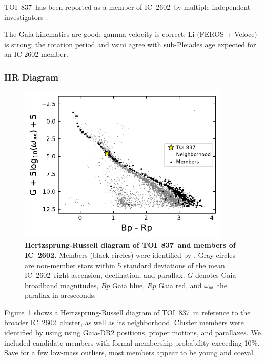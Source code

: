 \documentclass[12pt,twocolumn,tighten]{aastex62}
\newcommand{\tn}{TOI~837} %
\newcommand{\cn}{IC~2602} %
\begin{document}
\tn\ has been reported as a member of \cn\ by multiple independent 
investigators \citep{Kharchenko_et_al_2013,cantatgaudin_gaia_2018}.

The Gaia kinematics are good; gamma velocity is correct; Li (FEROS +
Veloce) is strong; the rotation period and vsini agree with
sub-Pleiades age expected for an IC 2602 member.

\subsubsection{HR Diagram}
\begin{figure}[t!]
	\begin{center}
		\leavevmode
		\includegraphics[width=0.9\textwidth]{f7.pdf}
	\end{center}
	\vspace{-0.7cm}
	\caption{ 
  {\bf Hertzsprung-Russell diagram of \tn\ and members of \cn.}
  Members (black circles) were identified by
  \citet{cantatgaudin_gaia_2018}.  Gray circles are non-member stars
  within 5 standard deviations of the mean \cn\ right ascension,
  declination, and parallax.  $G$ denotes Gaia broadband magnitudes,
  $Bp$ Gaia blue, $Rp$ Gaia red, and $\omega_{\rm as}$ the parallax in
  arcseconds. 
  \label{fig:hr}
	}
\end{figure}

Figure~\ref{fig:hr} shows a Hertzsprung-Russell diagram of \tn\ in
reference to the broader \cn\ cluster, as well as its neighborhood.
Cluster members were identified by \citet{cantatgaudin_gaia_2018}
using using Gaia-DR2 positions, proper motions, and parallaxes.  
We included candidate members with formal membership probability
exceeding 10\%.  Save for a few low-mass outliers, most members appear
to be young and coeval.
\end{document}
